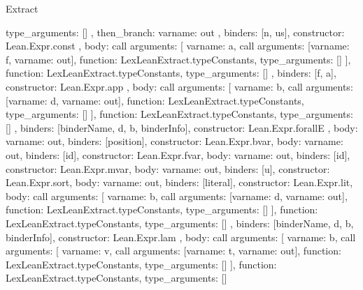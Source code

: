 \begin{lexlean}{Extract}
\begin{toolingmodule}
{{{{{{                type_arguments: []
              },
              then_branch: var{name: out}
            },
            binders: [n, us],
            constructor: Lean.Expr.const
          },
          {
            body: call{
              arguments: [
                var{name: a},
                call{
                  arguments: [var{name: f}, var{name: out}],
                  function: LexLeanExtract.typeConstants,
                  type_arguments: []
                }
              ],
              function: LexLeanExtract.typeConstants,
              type_arguments: []
            },
            binders: [f, a],
            constructor: Lean.Expr.app
          },
          {
            body: call{
              arguments: [
                var{name: b},
                call{
                  arguments: [var{name: d}, var{name: out}],
                  function: LexLeanExtract.typeConstants,
                  type_arguments: []
                }
              ],
              function: LexLeanExtract.typeConstants,
              type_arguments: []
            },
            binders: [binderName, d, b, binderInfo],
            constructor: Lean.Expr.forallE
          },
          {body: var{name: out}, binders: [position], constructor: Lean.Expr.bvar},
          {body: var{name: out}, binders: [id], constructor: Lean.Expr.fvar},
          {body: var{name: out}, binders: [id], constructor: Lean.Expr.mvar},
          {body: var{name: out}, binders: [u], constructor: Lean.Expr.sort},
          {body: var{name: out}, binders: [literal], constructor: Lean.Expr.lit},
          {
            body: call{
              arguments: [
                var{name: b},
                call{
                  arguments: [var{name: d}, var{name: out}],
                  function: LexLeanExtract.typeConstants,
                  type_arguments: []
                }
              ],
              function: LexLeanExtract.typeConstants,
              type_arguments: []
            },
            binders: [binderName, d, b, binderInfo],
            constructor: Lean.Expr.lam
          },
          {
            body: call{
              arguments: [
                var{name: b},
                call{
                  arguments: [
                    var{name: v},
                    call{
                      arguments: [var{name: t}, var{name: out}],
                      function: LexLeanExtract.typeConstants,
                      type_arguments: []
                    }
                  ],
                  function: LexLeanExtract.typeConstants,
                  type_arguments: []
}}}}}}
\end{toolingmodule}
\end{lexlean}
